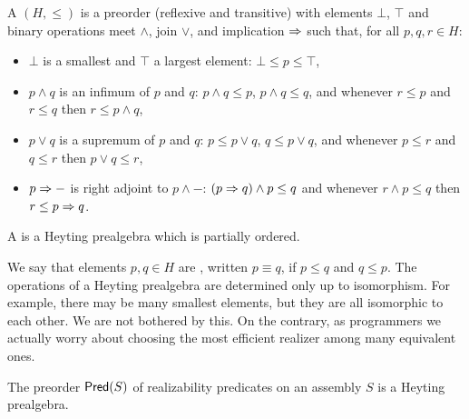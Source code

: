\begin{definition}
  A  $(H, {\leq})$ is a preorder (reflexive
  and transitive) with elements $\bot$, $\top$ and binary operations
  meet $\land$, join $\lor$, and implication $\Rightarrow$ such that, for all
  $p, q, r \in H$:
  \begin{itemize}
  \item $\bot$ is a smallest and $\top$ a largest element: $\bot \leq
    p \leq \top$,
  \item $p \land q$ is an infimum of $p$ and $q$: $p \land q \leq p$,
    $p \land q \leq q$, and whenever $r \leq p$ and $r \leq q$ then $r
    \leq p \land q$,
  \item $p \lor q$ is a supremum of $p$ and $q$: $p \leq p \lor q$, $q
    \leq p \lor q$, and whenever $p \leq r$ and $q \leq r$ then $p
    \lor q \leq r$,
  \item $p \Rightarrow {-}$ is right adjoint to $p \land {-}$: $(p \Rightarrow q)
    \land p \leq q$ and whenever $r \land p \leq q$ then $r \leq p
    \Rightarrow q$.
  \end{itemize}
  A  is a Heyting prealgebra which is partially
  ordered.
\end{definition}

We say that elements $p, q \in H$ are , written $p
\equiv q$, if $p \leq q$ and $q \leq p$. The operations of a Heyting
prealgebra are determined only up to isomorphism. For example, there
may be many smallest elements, but they are all isomorphic to each
other. We are not bothered by this. On the contrary, as programmers we
actually worry about choosing the most efficient realizer among many
equivalent ones.

\begin{proposition}
  The preorder $\mathsf{Pred}(S)$ of realizability predicates on an
  assembly $S$ is a Heyting prealgebra.
\end{proposition}


